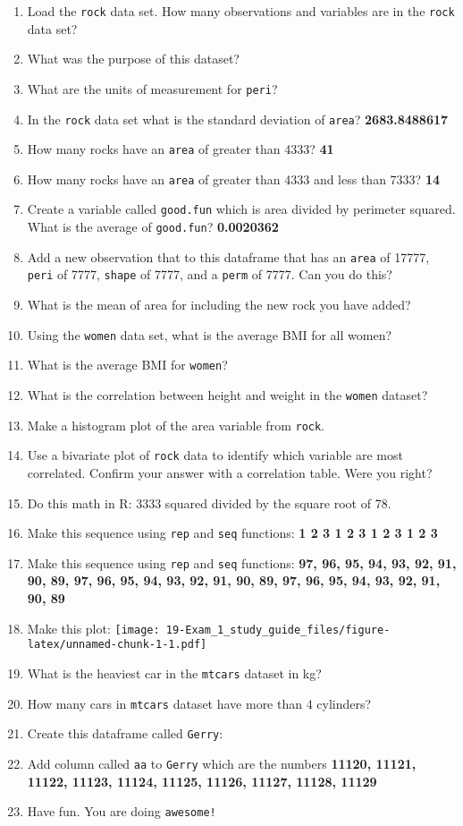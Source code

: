 \documentclass[
]{book}
\begin{document}
\begin{enumerate}
\def\labelenumi{\arabic{enumi}.}
\item
  Load the \texttt{rock} data set. How many observations and variables are in the \texttt{rock} data set?
\item
  What was the purpose of this dataset?
\item
  What are the units of measurement for \texttt{peri}?
\item
  In the \texttt{rock} data set what is the standard deviation of \texttt{area}? \textbf{2683.8488617}
\item
  How many rocks have an \texttt{area} of greater than 4333? \textbf{41}
\item
  How many rocks have an \texttt{area} of greater than 4333 and less than 7333? \textbf{14}
\item
  Create a variable called \texttt{good.fun} which is area divided by perimeter squared. What is the average of \texttt{good.fun}? \textbf{0.0020362}
\item
  Add a new observation that to this dataframe that has an \texttt{area} of 17777, \texttt{peri} of 7777, \texttt{shape} of 7777, and a \texttt{perm} of 7777. Can you do this?
\item
  What is the mean of area for including the new rock you have added?
\item
  Using the \texttt{women} data set, what is the average BMI for all women?
\item
  What is the average BMI for \texttt{women}?
\item
  What is the correlation between height and weight in the \texttt{women} dataset?
\item
  Make a histogram plot of the area variable from \texttt{rock}.
\item
  Use a bivariate plot of \texttt{rock} data to identify which variable are most correlated. Confirm your answer with a correlation table. Were you right?
\item
  Do this math in R: 3333 squared divided by the square root of 78.
\item
  Make this sequence using \texttt{rep} and \texttt{seq} functions: \textbf{1 2 3 1 2 3 1 2 3 1 2 3}
\item
  Make this sequence using \texttt{rep} and \texttt{seq} functions: \textbf{97, 96, 95, 94, 93, 92, 91, 90, 89, 97, 96, 95, 94, 93, 92, 91, 90, 89, 97, 96, 95, 94, 93, 92, 91, 90, 89}
\item
  Make this plot:
  \texttt{[image: 19-Exam\_1\_study\_guide\_files/figure-latex/unnamed-chunk-1-1.pdf]}
\item
  What is the heaviest car in the \texttt{mtcars} dataset in kg?
\item
  How many cars in \texttt{mtcars} dataset have more than 4 cylinders?
\item
  Create this dataframe called \texttt{Gerry}:
\item
  Add column called \texttt{aa} to \texttt{Gerry} which are the numbers \textbf{11120, 11121, 11122, 11123, 11124, 11125, 11126, 11127, 11128, 11129}
\item
  Have fun. You are doing \texttt{awesome!}
\end{enumerate}
\end{document}
